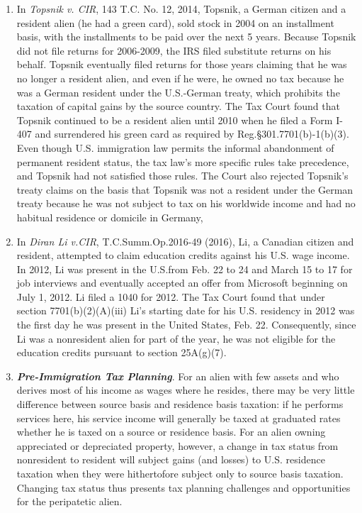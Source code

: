 \begin{enumerate}
	\item
	In \textit{Topsnik v. CIR}, 143 T.C. No. 12, 2014, Topsnik, a German citizen and a resident alien (he had a green card), sold stock in 2004 on an installment basis, with the installments to be paid over the next 5 years.  Because Topsnik did not file returns for 2006-2009, the IRS filed substitute returns on his behalf.  Topsnik eventually filed returns for those years claiming that he was no longer a resident alien, and even if he were, he owned no tax because he was a German resident under the U.S.-German treaty, which prohibits the taxation of capital gains by the source country.  The Tax Court found that Topsnik continued to be a resident alien until 2010 when he filed a Form I-407 and surrendered his green card as required by Reg.\@ \S301.7701(b)-1(b)(3).  Even though U.S. immigration law permits the informal abandonment of permanent resident status, the tax law's more specific rules take precedence, and Topsnik had not satisfied those rules.  The Court also rejected Topsnik's treaty claims on the basis that Topsnik was not a resident under the German treaty because he was not subject to tax on his worldwide income and had no habitual residence or domicile in Germany, 
	
	\item In \textit{Diran Li v.\@ CIR}, T.\@ C.\@  Summ.\@ Op.\@ 2016-49 (2016), Li, a Canadian citizen and resident, attempted to claim education credits against his U.S. wage income.  In 2012, Li was present in the U.\@ S.\@ from Feb. 22 to 24 and March 15 to 17 for job interviews and eventually accepted an offer from Microsoft beginning on July 1, 2012.  Li filed a 1040 for 2012.  The Tax Court found that under section 7701(b)(2)(A)(iii) Li's starting date for his U.S. residency in 2012 was the first day he was present in the United States, Feb. 22.  Consequently, since Li was a nonresident alien for part of the year, he was not eligible for the education credits pursuant to section 25A(g)(7).  	
	
	\item
					 
		\textbf{\emph{Pre-Immigration Tax Planning}}.  For an alien with few assets and who derives most of his income as wages where he resides, there may be very little difference between source basis and residence basis taxation: if he performs services here, his service income will generally be taxed at graduated rates whether he is taxed on a source or residence basis.  For an alien owning appreciated or depreciated property, however, a change in tax status from nonresident to resident will subject gains (and losses) to U.S. residence taxation when they were hithertofore subject only to source basis taxation.  Changing tax status thus presents tax planning challenges and opportunities for the peripatetic alien.    


\end{enumerate}

